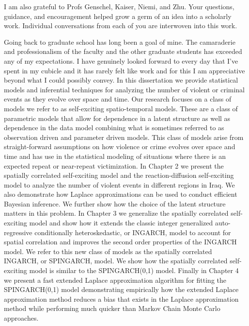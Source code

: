 \documentclass[11pt]{isuthesis}
\begin{document}
I am also grateful to Profs Genschel, Kaiser, Niemi, and Zhu.  Your questions, guidance, and encouragement helped grow a germ of an idea into a scholarly work.  Individual conversations from each of you are interwoven into this work.

Going back to graduate school has long been a goal of mine.  The camaraderie and professionalism of the faculty and the other graduate students has exceeded any of my expectations.  I have genuinely looked forward to every day that I've spent in my cubicle and it has rarely felt like work and for this I am appreciative beyond what I could possibly convey.
\cleardoublepage {}
{}
In this dissertation we provide statistical models and inferential techniques for analyzing the number of violent or criminal events as they evolve over space and time.  Our research focuses on a class of models we refer to as self-exciting spatio-temporal models.  These are a class of parametric models that allow for dependence in a latent structure as well as dependence in the data model combining what is sometimes referred to as observation driven and parameter driven models.  This class of models arise from straight-forward assumptions on how violence or crime evolves over space and time and has use in the statistical modeling of situations where there is an expected repeat or near-repeat victimization. In Chapter 2 we present the spatially correlated self-exciting model and the reaction-diffusion self-exciting model to analyze the number of violent events in different regions in Iraq.  We also demonstrate how Laplace approximations can be used to conduct efficient Bayesian inference.  We further show how the choice of the latent structure matters in this problem.  In Chapter 3 we generalize the spatially correlated self-exciting model and show how it extends the classic integer generalized auto-regressive conditionally heteroskedastic, or INGARCH, model to account for spatial correlation and improves the second order properties of the INGARCH model.  We refer to this new class of models as the spatially correlated INGARCH, or SPINGARCH, model.  We show how the spatially correlated self-exciting model is similar to the SPINGARCH(0,1) model.  Finally in Chapter 4 we present a fast extended Laplace approximation algorithm for fitting the SPINGARCH(0,1) model demonstrating empirically how the extended Laplace approximation method reduces a bias that exists in the Laplace approximation method while performing much quicker than Markov Chain Monte Carlo approaches. 
\newpage
{}
\end{document}
